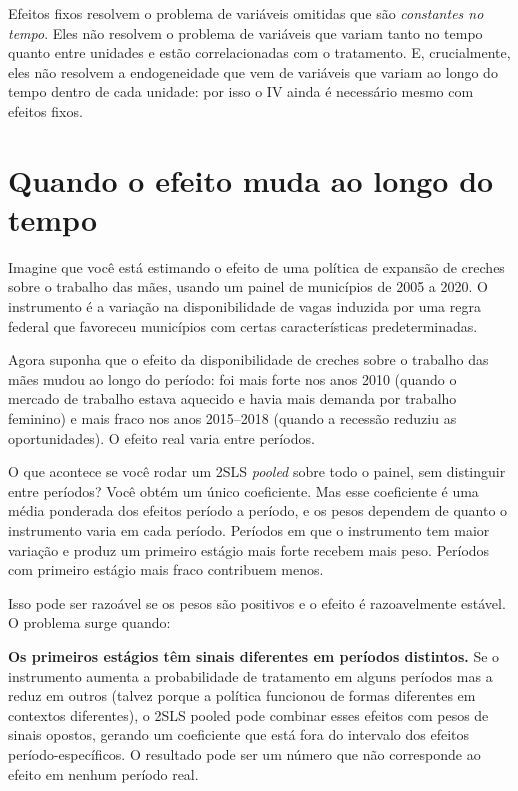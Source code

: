 Efeitos fixos resolvem o problema de variáveis omitidas que são \textit{constantes no tempo}. Eles não resolvem o problema de variáveis que variam tanto no tempo quanto entre unidades e estão correlacionadas com o tratamento. E, crucialmente, eles não resolvem a endogeneidade que vem de variáveis que variam ao longo do tempo dentro de cada unidade: por isso o IV ainda é necessário mesmo com efeitos fixos.

\section{Quando o efeito muda ao longo do tempo}
\label{sec:heterogeneidade_temporal}

Imagine que você está estimando o efeito de uma política de expansão de creches sobre o trabalho das mães, usando um painel de municípios de 2005 a 2020. O instrumento é a variação na disponibilidade de vagas induzida por uma regra federal que favoreceu municípios com certas características predeterminadas.

Agora suponha que o efeito da disponibilidade de creches sobre o trabalho das mães mudou ao longo do período: foi mais forte nos anos 2010 (quando o mercado de trabalho estava aquecido e havia mais demanda por trabalho feminino) e mais fraco nos anos 2015--2018 (quando a recessão reduziu as oportunidades). O efeito real varia entre períodos.

O que acontece se você rodar um 2SLS \textit{pooled} sobre todo o painel, sem distinguir entre períodos? Você obtém um único coeficiente. Mas esse coeficiente é uma média ponderada dos efeitos período a período, e os pesos dependem de quanto o instrumento varia em cada período. Períodos em que o instrumento tem maior variação e produz um primeiro estágio mais forte recebem mais peso. Períodos com primeiro estágio mais fraco contribuem menos.

Isso pode ser razoável se os pesos são positivos e o efeito é razoavelmente estável. O problema surge quando:

\textbf{Os primeiros estágios têm sinais diferentes em períodos distintos.} Se o instrumento aumenta a probabilidade de tratamento em alguns períodos mas a reduz em outros (talvez porque a política funcionou de formas diferentes em contextos diferentes), o 2SLS pooled pode combinar esses efeitos com pesos de sinais opostos, gerando um coeficiente que está fora do intervalo dos efeitos período-específicos. O resultado pode ser um número que não corresponde ao efeito em nenhum período real.

